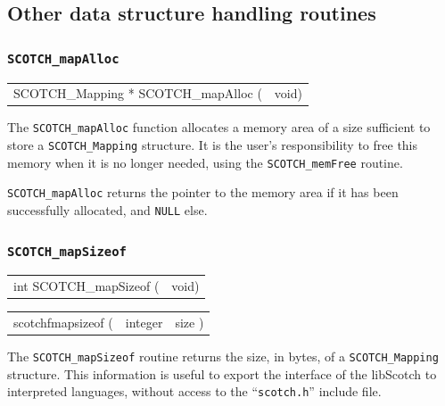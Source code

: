 \subsection{Other data structure handling routines}
\label{sec-lib-other}

\subsubsection{{\tt SCOTCH\_mapAlloc}}

\begin{itemize}
\progsyn

{\tt\begin{tabular}{l@{}l}
SCOTCH\_Mapping * SCOTCH\_mapAlloc ( & void)
\end{tabular}}

\progdes

The {\tt SCOTCH\_mapAlloc} function allocates a memory area of a
size sufficient to store a {\tt SCOTCH\_\lbt Mapping} structure. It is
the user's responsibility to free this memory when it is no longer
needed, using the {\tt SCOTCH\_\lbt mem\lbt Free} routine.

\progret

{\tt SCOTCH\_mapAlloc} returns the pointer to the memory area if it
has been successfully allocated, and {\tt NULL} else.
\end{itemize}

\subsubsection{{\tt SCOTCH\_mapSizeof}}

\begin{itemize}
\progsyn

{\tt\begin{tabular}{l@{}l}
int SCOTCH\_mapSizeof ( & void)
\end{tabular}}

{\tt\begin{tabular}{l@{}ll}
scotchfmapsizeof ( & integer & size )
\end{tabular}}

\progdes

The {\tt SCOTCH\_mapSizeof} routine returns the size, in bytes, of a
{\tt SCOTCH\_\lbt Mapping} structure. This information is useful to
export the interface of the {\sc libScotch} to interpreted languages,
without access to the ``{\tt scotch.h}'' include file.
\end{itemize}

